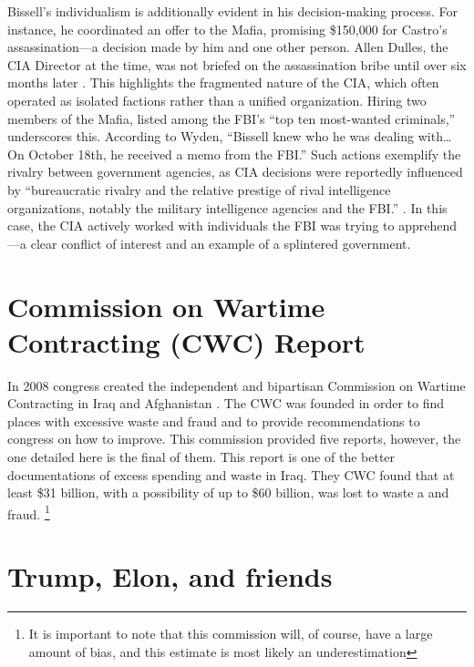 \documentclass{article}
\begin{document}
    Bissell's individualism is additionally evident in his decision-making process. For instance, he coordinated an offer to the Mafia, promising \$150,000 for Castro's assassination—a decision made by him and one other person.  Allen Dulles, the CIA Director at the time, was not briefed on the assassination bribe until over six months later \cite{Wyden1979}. This highlights the fragmented nature of the CIA, which often operated as isolated factions rather than a unified organization. Hiring two members of the Mafia, listed among the FBI's “top ten most-wanted criminals,” underscores this. According to Wyden, “Bissell knew who he was dealing with… On October 18th, he received a memo from the FBI.” Such actions exemplify the rivalry between government agencies, as CIA decisions were reportedly influenced by “bureaucratic rivalry and the relative prestige of rival intelligence organizations, notably the military intelligence agencies and the FBI.” \cite{JeffreysJones2003}. In this case, the CIA actively worked with individuals the FBI was trying to apprehend—a clear conflict of interest and an example of a splintered government.

\section{Commission on Wartime Contracting (CWC) Report}
    In 2008 congress created the independent and bipartisan Commission on Wartime Contracting in Iraq and Afghanistan \cite{CWC_2011}. The CWC was founded in order to find places with excessive waste and fraud and to provide recommendations to congress on how to improve. This commission provided five reports, however, the one detailed here is the final of them. This report is one of the better documentations of excess spending and waste in Iraq. They CWC found that at least \$31 billion, with a possibility of up to \$60 billion, was lost to waste a and fraud. \footnote{It is important to note that this commission will, of course, have a large amount of bias, and this estimate is most likely an underestimation} 

\section{Trump, Elon, and friends}
\pagebreak
\printbibliography[
    heading=bibintoc,
    title={\centering Sources}
    ]

    
\end{document}
